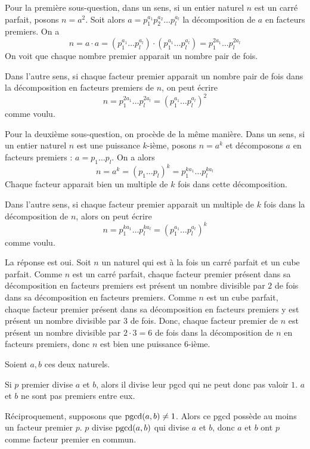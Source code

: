 \begin{sol}
Pour la première sous-question, dans un sens, si un entier naturel $n$ est un carré parfait, posons $n = a^2$. Soit alors $a = p_1^{a_1} p_2^{a_2} \dots p_l^{a_l}$ la décomposition de $a$ en facteurs premiers. On a
$$n = a \cdot a = \left(p_1^{a_1} \dots p_l^{a_l}\right) \cdot \left(p_1^{a_1} \dots p_l^{a_l}\right) = p_1^{2a_1} \dots p_l^{2a_l}$$
On voit que chaque nombre premier apparait un nombre pair de fois.

Dans l'autre sens, si chaque facteur premier apparait un nombre pair de fois dans la décomposition en facteurs premiers de $n$, on peut écrire
$$n = p_1^{2a_1} \dots p_l^{2a_l} = \left(p_1^{a_1} \dots p_l^{a_l}\right)^2$$
comme voulu.

Pour la deuxième sous-question, on procède de la même manière.
Dans un sens, si un entier naturel $n$ est une puissance $k$-ième, posons $n = a^k$ et décomposons $a$ en facteurs premiers : $a = p_1 \dots p_l$. On a alors
$$n = a^k = \left(p_1 \dots p_l\right)^k = p_1^{ka_1} \dots p_l^{ka_l}$$
Chaque facteur apparait bien un multiple de $k$ fois dans cette décomposition.

Dans l'autre sens, si chaque facteur premier apparait un multiple de $k$ fois dans la décomposition de $n$, alors on peut écrire
$$n = p_1^{ka_1} \dots p_l^{ka_l} = \left(p_1^{a_1} \dots p_l^{a_l}\right)^k$$
comme voulu.
\end{sol}


\begin{sol}
La réponse est oui. Soit $n$ un naturel qui est à la fois un carré parfait et un cube parfait. Comme $n$ est un carré parfait, chaque facteur premier présent dans sa décomposition en facteurs premiers est présent un nombre divisible par $2$ de fois dans sa décomposition en facteurs premiers. Comme $n$ est un cube parfait, chaque facteur premier présent dans sa décomposition en facteurs premiers y est présent un nombre divisible par $3$ de fois. Donc, chaque facteur premier de $n$ est présent un nombre divisible par $2 \cdot 3 = 6$ de fois dans la décomposition de $n$ en facteurs premiers, donc $n$ est bien une puissance $6$-ième.
\end{sol}


\begin{sol}
Soient $a, b$ ces deux naturels.

Si $p$ premier divise $a$ et $b$, alors il divise leur pgcd qui ne peut donc pas valoir $1$. $a$ et $b$ ne sont pas premiers entre eux.

Réciproquement, supposons que $\operatorname{\mathrm{pgcd}}(a, b) \ne 1$. Alors ce pgcd possède au moins un facteur premier $p$. $p$ divise $\operatorname{\mathrm{pgcd}}(a, b)$ qui divise $a$ et $b$, donc $a$ et $b$ ont $p$ comme facteur premier en commun.
\end{sol}


